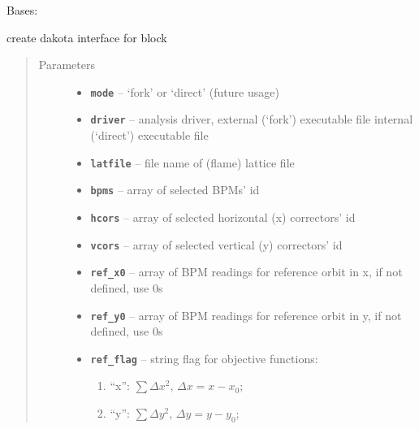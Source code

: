 \documentclass[letterpaper,10pt,english]{sphinxmanual}
\begin{document}
\begin{fulllineitems}
\label{src/apidocs/dakutils:genopt.dakutils.DakotaInterface}
Bases: \href{https://docs.python.org/2/library/functions.html\#object}{}

create dakota interface for  block
\begin{quote}\begin{description}
\item[{Parameters}] \leavevmode\begin{itemize}
\item {} 
\textbf{\texttt{mode}} -- `fork' or `direct' (future usage)

\item {} 
\textbf{\texttt{driver}} -- analysis driver, external (`fork') executable file
internal (`direct') executable file

\item {} 
\textbf{\texttt{latfile}} -- file name of (flame) lattice file

\item {} 
\textbf{\texttt{bpms}} -- array of selected BPMs' id

\item {} 
\textbf{\texttt{hcors}} -- array of selected horizontal (x) correctors' id

\item {} 
\textbf{\texttt{vcors}} -- array of selected vertical (y) correctors' id

\item {} 
\textbf{\texttt{ref\_x0}} -- array of BPM readings for reference orbit in x, if not defined, use 0s

\item {} 
\textbf{\texttt{ref\_y0}} -- array of BPM readings for reference orbit in y, if not defined, use 0s

\item {} 
\textbf{\texttt{ref\_flag}} -- 
string flag for objective functions:
\begin{enumerate}
\item {} 
``x'': \(\sum \Delta x^2\), \(\Delta x = x-x_0\);

\item {} 
``y'': \(\sum \Delta y^2\), \(\Delta y = y-y_0\);


\end{enumerate}
\end{itemize}
\end{description}
\end{quote}
\end{fulllineitems}
\end{document}
